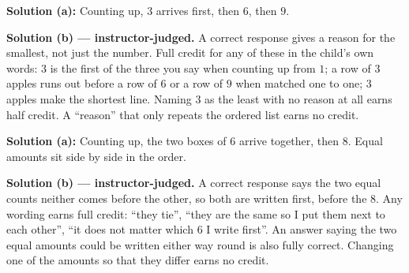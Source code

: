 \documentclass[12pt]{article}
\begin{document}
\textbf{Solution (a):} Counting up, $3$ arrives first, then $6$, then $9$. 

\textbf{Solution (b) --- instructor-judged.} A correct response gives a reason for the smallest, not just the number. Full credit for any of these in the child's own words: $3$ is the first of the three you say when counting up from $1$; a row of $3$ apples runs out before a row of $6$ or a row of $9$ when matched one to one; $3$ apples make the shortest line. Naming $3$ as the least with no reason at all earns half credit. A ``reason'' that only repeats the ordered list earns no credit.


\textbf{Solution (a):} Counting up, the two boxes of $6$ arrive together, then $8$. Equal amounts sit side by side in the order. 

\textbf{Solution (b) --- instructor-judged.} A correct response says the two equal counts neither comes before the other, so both are written first, before the $8$. Any wording earns full credit: ``they tie'', ``they are the same so I put them next to each other'', ``it does not matter which $6$ I write first''. An answer saying the two equal amounts could be written either way round is also fully correct. Changing one of the amounts so that they differ earns no credit.
\end{document}
